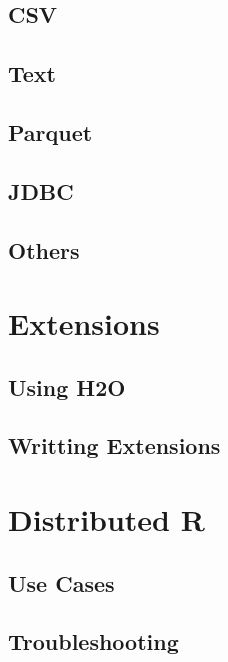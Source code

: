 \documentclass[]{book}
\theoremstyle{definition}
\theoremstyle{definition}
\theoremstyle{definition}
\theoremstyle{remark}
\begin{document}
\section{CSV}\label{csv}

\section{Text}\label{text}

\section{Parquet}\label{parquet}

\section{JDBC}\label{jdbc}

\section{Others}\label{others}

\chapter{Extensions}\label{extensions}

\section{Using H2O}\label{using-h2o}

\section{Writting Extensions}\label{writting-extensions}

\chapter{Distributed R}\label{distributed}

\section{Use Cases}\label{use-cases}

\section{Troubleshooting}\label{troubleshooting}
\end{document}
